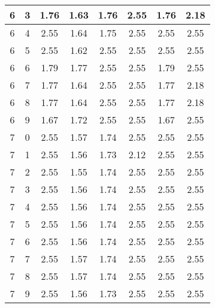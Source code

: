 \begin{longtable}{|c|c||c||c|c|c||c|c|}
	6 & 3 & 1.76 & 1.63 & 1.76 & 2.55 & 1.76 & 2.18 \\ \hline
	6 & 4 & 2.55 & 1.64 & 1.75 & 2.55 & 2.55 & 2.55 \\ \hline
	6 & 5 & 2.55 & 1.62 & 2.55 & 2.55 & 2.55 & 2.55 \\ \hline
	6 & 6 & 1.79 & 1.77 & 2.55 & 2.55 & 1.79 & 2.55 \\ \hline
	6 & 7 & 1.77 & 1.64 & 2.55 & 2.55 & 1.77 & 2.18 \\ \hline
	6 & 8 & 1.77 & 1.64 & 2.55 & 2.55 & 1.77 & 2.18 \\ \hline
	6 & 9 & 1.67 & 1.72 & 2.55 & 2.55 & 1.67 & 2.55 \\ \hline
	7 & 0 & 2.55 & 1.57 & 1.74 & 2.55 & 2.55 & 2.55 \\ \hline
	7 & 1 & 2.55 & 1.56 & 1.73 & 2.12 & 2.55 & 2.55 \\ \hline
	7 & 2 & 2.55 & 1.55 & 1.74 & 2.55 & 2.55 & 2.55 \\ \hline
	7 & 3 & 2.55 & 1.56 & 1.74 & 2.55 & 2.55 & 2.55 \\ \hline
	7 & 4 & 2.55 & 1.56 & 1.74 & 2.55 & 2.55 & 2.55 \\ \hline
	7 & 5 & 2.55 & 1.56 & 1.74 & 2.55 & 2.55 & 2.55 \\ \hline
	7 & 6 & 2.55 & 1.56 & 1.74 & 2.55 & 2.55 & 2.55 \\ \hline
	7 & 7 & 2.55 & 1.57 & 1.74 & 2.55 & 2.55 & 2.55 \\ \hline
	7 & 8 & 2.55 & 1.57 & 1.74 & 2.55 & 2.55 & 2.55 \\ \hline
	7 & 9 & 2.55 & 1.56 & 1.73 & 2.55 & 2.55 & 2.55 \\ \hline
\end{longtable}
\clearpage{}
